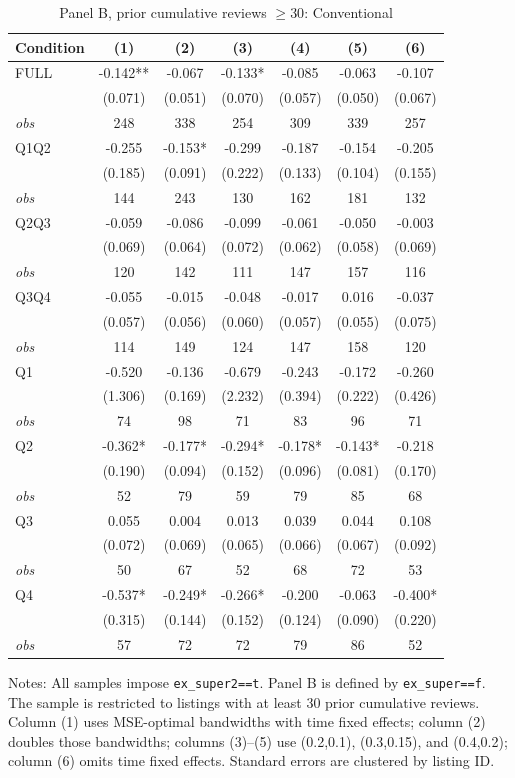 \begin{table}[!htbp]
\centering
\caption{Panel B, prior cumulative reviews $\geq30$: Conventional}
\begin{tabular}{lcccccc}
\toprule
Condition & (1) & (2) & (3) & (4) & (5) & (6) \\
\midrule
FULL & -0.142** & -0.067 & -0.133* & -0.085 & -0.063 & -0.107 \\
 & (0.071) & (0.051) & (0.070) & (0.057) & (0.050) & (0.067) \\
\textit{obs} & 248 & 338 & 254 & 309 & 339 & 257 \\
Q1Q2 & -0.255 & -0.153* & -0.299 & -0.187 & -0.154 & -0.205 \\
 & (0.185) & (0.091) & (0.222) & (0.133) & (0.104) & (0.155) \\
\textit{obs} & 144 & 243 & 130 & 162 & 181 & 132 \\
Q2Q3 & -0.059 & -0.086 & -0.099 & -0.061 & -0.050 & -0.003 \\
 & (0.069) & (0.064) & (0.072) & (0.062) & (0.058) & (0.069) \\
\textit{obs} & 120 & 142 & 111 & 147 & 157 & 116 \\
Q3Q4 & -0.055 & -0.015 & -0.048 & -0.017 & 0.016 & -0.037 \\
 & (0.057) & (0.056) & (0.060) & (0.057) & (0.055) & (0.075) \\
\textit{obs} & 114 & 149 & 124 & 147 & 158 & 120 \\
Q1 & -0.520 & -0.136 & -0.679 & -0.243 & -0.172 & -0.260 \\
 & (1.306) & (0.169) & (2.232) & (0.394) & (0.222) & (0.426) \\
\textit{obs} & 74 & 98 & 71 & 83 & 96 & 71 \\
Q2 & -0.362* & -0.177* & -0.294* & -0.178* & -0.143* & -0.218 \\
 & (0.190) & (0.094) & (0.152) & (0.096) & (0.081) & (0.170) \\
\textit{obs} & 52 & 79 & 59 & 79 & 85 & 68 \\
Q3 & 0.055 & 0.004 & 0.013 & 0.039 & 0.044 & 0.108 \\
 & (0.072) & (0.069) & (0.065) & (0.066) & (0.067) & (0.092) \\
\textit{obs} & 50 & 67 & 52 & 68 & 72 & 53 \\
Q4 & -0.537* & -0.249* & -0.266* & -0.200 & -0.063 & -0.400* \\
 & (0.315) & (0.144) & (0.152) & (0.124) & (0.090) & (0.220) \\
\textit{obs} & 57 & 72 & 72 & 79 & 86 & 52 \\
\bottomrule
\end{tabular}
\begin{minipage}{0.98\textwidth}\footnotesize
Notes: All samples impose \texttt{ex\_super2==t}. Panel B is defined by \texttt{ex\_super==f}. The sample is restricted to listings with at least 30 prior cumulative reviews. Column (1) uses MSE-optimal bandwidths with time fixed effects; column (2) doubles those bandwidths; columns (3)--(5) use (0.2,0.1), (0.3,0.15), and (0.4,0.2); column (6) omits time fixed effects. Standard errors are clustered by listing ID.
\end{minipage}
\end{table}
